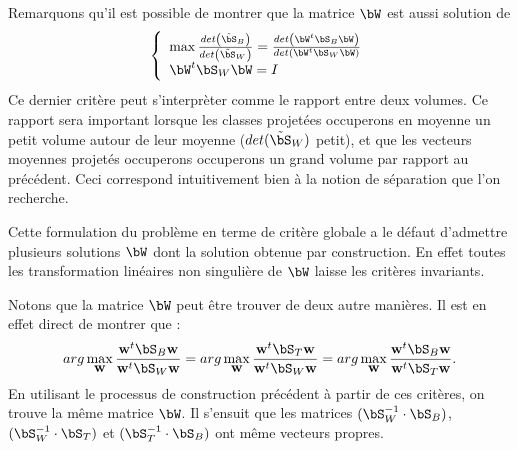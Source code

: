 Remarquons qu'il est possible de montrer que la matrice $\bW$ est aussi
solution de 
$$
\left \{ \begin{array}{l}
\max \frac{det\left ( \tilde{\bS}_B \right )}{det \left (\tilde{\bS}_W \right ) }=\frac{det\left ( \bW^t \bS_B \bW \right )}{det\left (\bW^t \bS_W \bW \right )}\\
\bW^t \bS_W \bW=I
\end{array}
\right.
$$
Ce dernier crit\`ere peut  s'interpr\`eter comme le rapport
 entre deux volumes. Ce rapport sera important lorsque  les 
classes projet\'ees  occuperons en moyenne un petit volume autour
de leur moyenne ($det(\tilde{\bS}_W)$ petit), et que les vecteurs moyennes
projet\'es occuperons occuperons un grand volume par rapport au pr\'ec\'edent.
Ceci correspond intuitivement bien \`a la notion de s\'eparation que l'on recherche.

Cette formulation du probl\`eme en terme de crit\`ere globale a
le d\'efaut d'admettre plusieurs solutions $\bW$ dont la solution
obtenue par construction. En effet toutes les transformation lin\'eaires
non singuli\`ere de $\bW$ laisse les crit\`eres invariants.

Notons que la matrice $\bW$ peut \^etre trouver de deux autre mani\`eres. Il 
est en effet direct de montrer que :
$$
arg \max_{\bw} \frac{\bw^t \bS_B \bw}{\bw^t \bS_W \bw} =
arg \max_{\bw} \frac{\bw^t \bS_T \bw}{\bw^t \bS_W \bw} =
arg \max_{\bw} \frac{\bw^t \bS_B \bw}{\bw^t \bS_T \bw}.
$$
En utilisant le processus de construction pr\'ec\'edent \`a partir
de ces crit\`eres, on trouve la m\^eme matrice $\bW$. Il s'ensuit
que les matrices  $(\bS_W^{-1}\cdot \bS_B)$, $(\bS_W^{-1}\cdot \bS_T)$ et 
$(\bS_T^{-1}\cdot \bS_B)$ ont m\^eme vecteurs propres.





